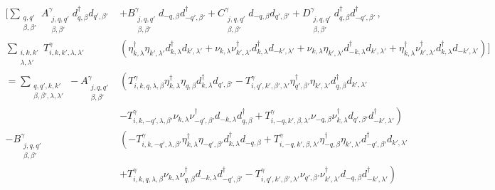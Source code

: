 \begin{align}\nonumber
    [ \sum_{\substack{q,q'\\ \beta, \beta' }} A_{\substack{j,q,q'\\ \beta, \beta'}}^{ \gamma} d^{\dag}_{q,\beta} d_{q', \beta'}
    &+ B_{\substack{j,q,q'\\ \beta, \beta'}}^{ \gamma} d_{-q,\beta} d^{\dag}_{-q', \beta'}
    + C_{\substack{j,q,q'\\ \beta, \beta'}}^{ \gamma} d_{-q,\beta} d_{q', \beta'}
    + D_{\substack{j,q,q'\\ \beta, \beta'}}^{ \gamma} d^{\dag}_{q,\beta} d^{\dag}_{-q', \beta'} \, , \\ \nonumber
    \sum_{\substack{i, k,k'\\ \lambda, \lambda' }} T^{ \gamma}_{i,k, k', \lambda, \lambda'} &\left(
    \eta^{\dag}_{k, \lambda}\eta_{k',\lambda'} d^{\dag}_{k,\lambda}d_{k',\lambda'}
    + \nu_{k,\lambda} \nu^{\dag}_{k',\lambda'} d^{\dag}_{k,\lambda}d_{-k',\lambda'}
    + \nu_{k,\lambda}\eta_{k',\lambda'} d^{\dag}_{-k,\lambda}d_{k',\lambda'} 
    + \eta^{\dag}_{k,\lambda} \nu^{\dag}_{k',\lambda'} d^{\dag}_{k,\lambda}d_{-k',\lambda'} \right) ]\\ \nonumber
    = \sum_{\substack{q,q', k, k' \\ \beta, \beta', \lambda, \lambda' }} - A_{\substack{j,q,q'\\ \beta, \beta'}}^{ \gamma} &\left(T^{ \gamma}_{i,k, q, \lambda, \beta}\eta^{\dag}_{k, \lambda}\eta_{q,\beta} d^{\dag}_{k,\lambda}d_{q',\beta'} 
    - T^{ \gamma}_{i,q', k', \beta', \lambda'}\eta^{\dag}_{q', \beta'}\eta_{k',\lambda'} d^{\dag}_{q,\beta}d_{k',\lambda'} \right. \\ \nonumber
    &\left. - T^{ \gamma}_{i,k, -q', \lambda, \beta'}\nu_{k,\lambda} \nu^{\dag}_{-q',\beta'} d_{-k,\lambda}d^{\dag}_{q,\beta} 
    + T^{ \gamma}_{i,-q, k', \beta, \lambda'}\nu_{-q,\beta} \nu^{\dag}_{k,\lambda} d_{q',\beta'}d^{\dag}_{-k',\lambda'} \right) \\ \nonumber
    - B_{\substack{j,q,q'\\ \beta, \beta'}}^{ \gamma}&\left(-T^{ \gamma}_{i,k, -q', \lambda, \beta'}\eta^{\dag}_{k, \lambda}\eta_{-q',\beta'} d^{\dag}_{k,\lambda}d_{-q,\beta} 
    + T^{ \gamma}_{i,-q, k', \beta, \lambda'}\eta^{\dag}_{-q, \beta}\eta_{k',\lambda'} d^{\dag}_{-q',\beta'}d_{k',\lambda'} \right. \\ \nonumber
    &\left. + T^{ \gamma}_{i,k, q, \lambda, \beta}\nu_{k,\lambda} \nu^{\dag}_{q,\beta} d_{-k,\lambda}d^{\dag}_{-q',\beta'} 
    - T^{ \gamma}_{i,q', k', \beta', \lambda'}\nu_{q',\beta'} \nu^{\dag}_{k',\lambda'} d_{-q,\beta}d^{\dag}_{-k',\lambda'} \right) \\ \nonumber

\end{align}
